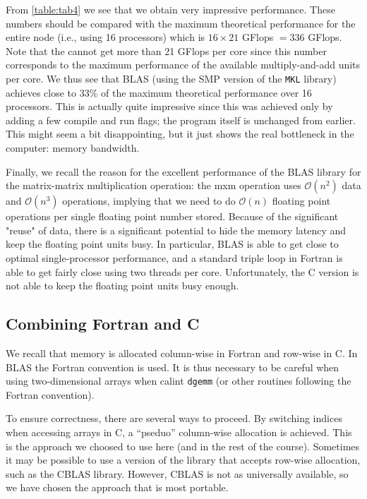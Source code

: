 From \autoref{table:tab4} we see that we obtain very impressive performance.
These numbers should be compared with the maximum theoretical performance for
the entire node (i.e., using 16 processors) which is $16\times 21$ GFlops $=
336$ GFlops. Note that the cannot get more than 21 GFlops per core since this
number corresponds to the maximum performance of the available multiply-and-add
units per core. We thus see that BLAS (using the SMP version of the \texttt{MKL}
library) achieves close to 33\% of the maximum theoretical performance over 16
processors. This is actually quite impressive since this was achieved only by
adding a few compile and run flags; the program itself is unchanged from
earlier. This might seem a bit disappointing, but it just shows the real
bottleneck in the computer: memory bandwidth.

Finally, we recall the reason for the excellent performance of the BLAS library
for the matrix-matrix multiplication operation: the mxm operation uses
$\mathcal{O}(n^2)$ data and $\mathcal{O}(n^3)$ operations, implying that we need
to do $\mathcal{O}(n)$ floating point operations per single floating point
number stored. Because of the significant "reuse" of data, there is a
significant potential to hide the memory latency and keep the floating point
units busy. In particular, BLAS is able to get close to optimal single-processor
performance, and a standard triple loop in Fortran is able to get fairly close
using two threads per core. Unfortunately, the C version is not able to keep the
floating point units busy enough.

\subsection{Combining Fortran and C}

We recall that memory is allocated column-wise in Fortran and row-wise in C. In
BLAS the Fortran convention is used. It is thus necessary to be careful when
using two-dimensional arrays when calint \texttt{dgemm} (or other routines
following the Fortran convention).

To ensure correctness, there are several ways to proceed. By switching indices
when accessing arrays in C, a ``pseduo'' column-wise allocation is achieved.
This is the approach we choosed to use here (and in the rest of the course).
Sometimes it may be possible to use a version of the library that accepts
row-wise allocation, such as the CBLAS library. However, CBLAS is not as
universally available, so we have chosen the approach that is most portable.

